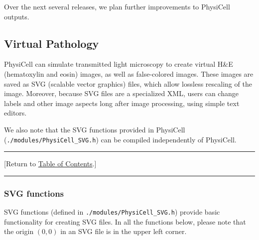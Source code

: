 \documentclass[12pt]{article}
\renewcommand{\v}{\verb}
\newcommand{\blue}[1]{\textcolor{blue}{#1}}
\newcommand{\DONE}{}%
\newcommand{\TOClink}{\begin{center}\hrule\vskip-10pt\phantom{.}\hfill[Return to \hyperlink{TOC}{Table of Contents}.]\hfill\phantom{.}\vskip3pt\hrule\end{center}}
\begin{document}
Over the next several releases, we plan further improvements to 
PhysiCell outputs. 

\subsection{Virtual Pathology} 
\label{sec:Pathology}
PhysiCell can simulate transmitted light microscopy 
to create virtual H\&E (hematoxylin and eosin) images, 
as well as false-colored images. These images 
are saved as SVG (scalable vector graphics) files, 
which allow lossless rescaling of the image. Moreover, 
because SVG files are a specialized XML, users can 
change labels and other image aspects long after image processing, 
using simple text editors. 

We also note that the SVG functions provided in PhysiCell 
(\v|./modules/PhysiCell_SVG.h|) can be compiled independently 
of PhysiCell. 

\TOClink

\subsubsection{SVG functions \DONE}
\label{sec:SVG_functions}
SVG functions (defined in \v|./modules/PhysiCell_SVG.h|) provide basic 
functionality for creating SVG files. In all the functions below, 
please note that the origin $(0,0)$ in an SVG file is in the upper 
left corner. 
\end{document}
